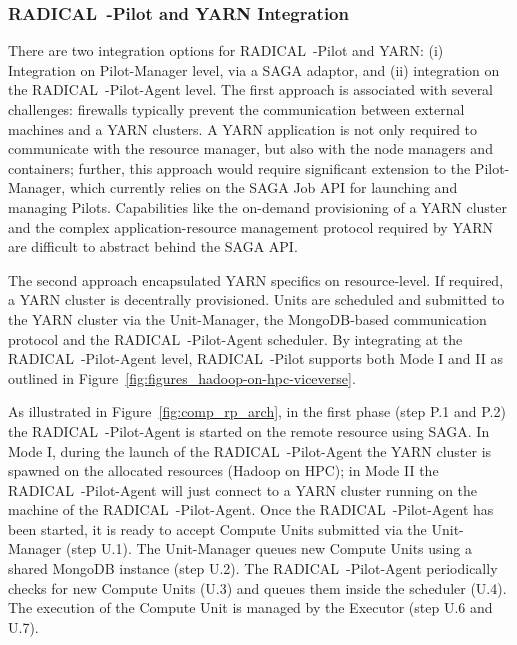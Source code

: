 \subsubsection{RADICAL~-Pilot and YARN Integration}
\label{sssec:rp-yarn}

There are two integration options for RADICAL~-Pilot and YARN: (i) Integration on Pilot-Manager level, via a SAGA adaptor, and (ii) integration on the RADICAL~-Pilot-Agent level.
The first approach is associated with several challenges: firewalls typically prevent the communication between external machines and a YARN clusters.
A YARN application is not only required to communicate with the resource manager, but also with the node managers and containers; further, this approach would require significant extension to the Pilot-Manager, which currently relies on the SAGA Job API for launching and managing Pilots.
Capabilities like the on-demand provisioning of a YARN cluster and the complex application-resource management protocol required by YARN are difficult to abstract behind the SAGA API.

The second approach encapsulated YARN specifics on resource-level.
If required, a YARN cluster is decentrally provisioned.
Units are scheduled and submitted to the YARN cluster via the Unit-Manager, the MongoDB-based communication protocol and the RADICAL~-Pilot-Agent scheduler.
By integrating at the RADICAL~-Pilot-Agent level, RADICAL~-Pilot supports both Mode I and II as outlined in Figure~\ref{fig:figures_hadoop-on-hpc-viceverse}.

As illustrated in Figure~\ref{fig:comp_rp_arch}, in the first phase (step P.1 and P.2) the RADICAL~-Pilot-Agent is started on the remote resource using SAGA.
In Mode I, during the launch of the RADICAL~-Pilot-Agent the YARN cluster is spawned on the allocated resources (Hadoop on HPC); in Mode II the RADICAL~-Pilot-Agent will just connect to a YARN cluster running on the machine of the RADICAL~-Pilot-Agent.
Once the RADICAL~-Pilot-Agent has been started, it is ready to accept Compute Units submitted via the Unit-Manager (step U.1).
The Unit-Manager queues new Compute Units using a shared MongoDB instance (step U.2).
The RADICAL~-Pilot-Agent periodically checks for new Compute Units (U.3) and queues them inside the scheduler (U.4).
The execution of the Compute Unit is managed by the Executor (step U.6 and U.7).

